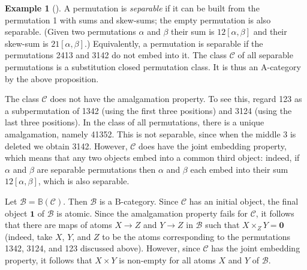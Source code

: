 \documentclass[12pt]{amsart}
\numberwithin{equation}{section}
\theoremstyle{definition}
\newtheorem{eg}[equation]{Example}
\newenvironment{example}[1][]{\begin{eg}[#1] \pushQED{\qed}}{\popQED \end{eg}}
\newcommand{\rA}{\mathrm{A}}
\newcommand{\cB}{\mathcal{B}}
\newcommand{\rB}{\mathrm{B}}
\newcommand{\cC}{\mathcal{C}}
\newcommand{\defn}[1]{\emph{#1}}
\newcommand{\BB}{\mathbb{B}}
\newcommand{\bzero}{\mathbf{0}}
\newcommand{\bone}{\mathbf{1}}
\begin{document}
\begin{example} \label{ex:separable}
A permutation is \defn{separable} if it can be built from the permutation 1 with sums and skew-sums; the empty permutation is also separable. (Given two permutations $\alpha$ and $\beta$ their sum is $12[\alpha,\beta]$ and their skew-sum is $21[\alpha,\beta]$.) Equivalently, a permutation is separable if the permutations 2413 and 3142 do not embed into it. The class $\cC$ of all separable permutations is a substitution closed permutation class. It is thus an $\rA$-category by the above proposition.

The class $\cC$ does not have the amalgamation property. To see this, regard 123 as a subpermutation of 1342 (using the first three positions) and 3124 (using the last three positions). In the class of all permutations, there is a unique amalgamation, namely 41352. This is not separable, since when the middle 3 is deleted we obtain 3142. However, $\cC$ does have the joint embedding property, which means that any two objects embed into a common third object: indeed, if $\alpha$ and $\beta$ are separable permutations then $\alpha$ and $\beta$ each embed into their sum $12[\alpha,\beta]$, which is also separable.

Let $\cB=\BB(\cC)$. Then $\cB$ is a $\rB$-category. Since $\cC$ has an initial object, the final object $\bone$ of $\cB$ is atomic. Since the amalgamation property fails for $\cC$, it follows that there are maps of atoms $X \to Z$ and $Y \to Z$ in $\cB$ such that $X \times_Z Y=\bzero$ (indeed, take $X$, $Y$, and $Z$ to be the atoms corresponding to the permutations 1342, 3124, and 123 discussed above). However, since $\cC$ has the joint embedding property, it follows that $X \times Y$ is non-empty for all atoms $X$ and $Y$ of $\cB$.
\end{example}
\end{document}
